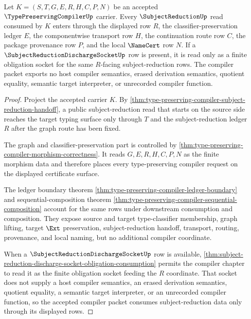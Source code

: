 \begin{theorem}
\label{thm:type-preserving-compiler-subject-reduction-socket-consumption}
Let $K=(S,T,G,E,R,H,C,P,N)$ be an accepted $\TypePreservingCompilerUp$ carrier. Every $\SubjectReductionUp$ read consumed by $K$ enters through the displayed row $R$, the classifier-preservation ledger $E$, the componentwise transport row $H$, the continuation route row $C$, the package provenance row $P$, and the local $\NameCert$ row $N$. If a $\SubjectReductionDischargeSocketUp$ row is present, it is read only as a finite obligation socket for the same $R$-facing subject-reduction rows. The compiler packet exports no host compiler semantics, erased derivation semantics, quotient equality, semantic target interpreter, or unrecorded compiler function.
\end{theorem}
\begin{proof}
Project the accepted carrier $K$. By \autoref{thm:type-preserving-compiler-subject-reduction-handoff}, a public subject-reduction read that starts on the source side reaches the target typing surface only through $T$ and the subject-reduction ledger $R$ after the graph route has been fixed.

The graph and classifier-preservation part is controlled by \autoref{thm:type-preserving-compiler-morphism-correctness}. It reads $G,E,R,H,C,P,N$ as the finite morphism data and therefore places every type-preserving compiler request on the displayed certificate surface.

The ledger boundary theorem \autoref{thm:type-preserving-compiler-ledger-boundary} and sequential-composition theorem \autoref{thm:type-preserving-compiler-sequential-composition} account for the same rows under downstream consumption and composition. They expose source and target type-classifier membership, graph lifting, target $\Ext$ preservation, subject-reduction handoff, transport, routing, provenance, and local naming, but no additional compiler coordinate.

When a $\SubjectReductionDischargeSocketUp$ row is available, \autoref{thm:subject-reduction-discharge-socket-obligation-consumption} permits the compiler chapter to read it as the finite obligation socket feeding the $R$ coordinate. That socket does not supply a host compiler semantics, an erased derivation semantics, quotient equality, a semantic target interpreter, or an unrecorded compiler function, so the accepted compiler packet consumes subject-reduction data only through its displayed rows.
\end{proof}

